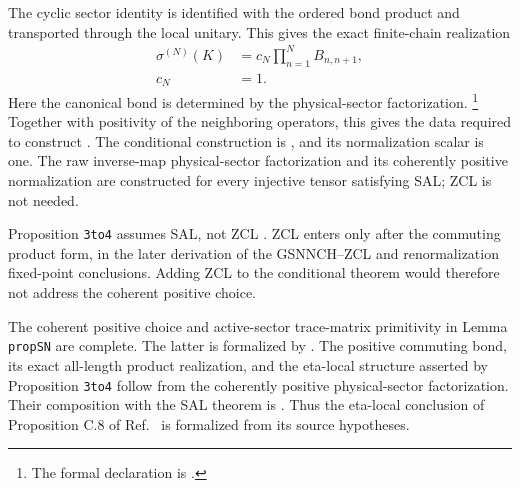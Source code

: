 \documentclass{article}
\begin{document}
The cyclic sector identity is identified with the ordered bond product and
transported through the local unitary. This gives the exact finite-chain
realization
\begin{align}
    \sigma^{(N)}(K)
        &=
        c_N\prod_{n=1}^{N}B_{n,n+1},
    \label{eq:cpgsv17_mpdo_sal_zcl_eta_local_structure_exact_bond_realization}\\
    c_N
        &=1.
    \label{eq:cpgsv17_mpdo_sal_zcl_eta_local_structure_canonical_bond_scalar}
\end{align}
Here the canonical bond is determined by the physical-sector factorization.
\footnote{The formal declaration is
.}
Together with positivity of the neighboring operators, this gives the data
required to construct . The
conditional construction is
, and its
normalization scalar is one. The raw inverse-map physical-sector factorization
and its coherently positive normalization are constructed for every injective
tensor satisfying SAL; ZCL is not needed.

Proposition \texttt{3to4} assumes SAL, not ZCL
\cite{Cirac2016MPDO_arXiv}. ZCL enters only after the commuting product form,
in the later derivation of the GSNNCH--ZCL and renormalization fixed-point
conclusions. Adding ZCL to the conditional theorem would therefore not address
the coherent positive choice.

The coherent positive choice and active-sector trace-matrix primitivity in
Lemma \texttt{propSN} are complete. The latter is formalized by
.
The positive commuting bond, its exact all-length product realization, and the
eta-local structure asserted by Proposition \texttt{3to4} follow from the
coherently positive physical-sector factorization. Their composition with the
SAL theorem is
. Thus the eta-local
conclusion of Proposition C.8 of Ref.~\cite{Cirac2016MPDO_arXiv} is formalized
from its source hypotheses.
\end{document}

